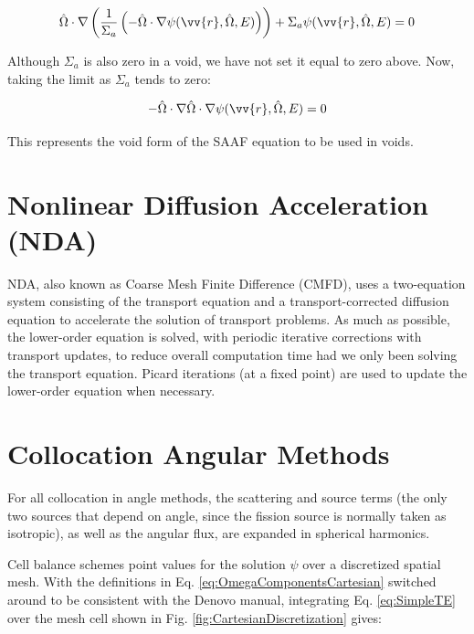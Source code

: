 \documentclass[10pt]{article}
\newcommand{\hO}{\hat{\Omega}}
\newcounter{subsubsubsection}[subsubsection]
\begin{document}
\begin{flushleft}
\begin{equation}
\label{eq:SAAFvoid1}
\hO   \cdot \nabla \left( \frac{1}{\Sigma_a}\left(-\hO  \cdot\nabla\psi(\vv{r}, \hO  , E)\right)\right) + \Sigma_a\psi(\vv{r}, \hO  , E) = 0
\end{equation}

Although \(\Sigma_a\) is also zero in a void, we have not set it equal to zero above. Now, taking the limit as \(\Sigma_a\) tends to zero:

\begin{equation}
\label{eq:SAAFvoid2}
-\hO   \cdot \nabla\hO  \cdot\nabla\psi(\vv{r}, \hO  , E) = 0
\end{equation}

This represents the void form of the SAAF equation to be used in voids.



\clearpage
\section{Nonlinear Diffusion Acceleration (NDA)}


NDA, also known as Coarse Mesh Finite Difference (CMFD), uses a two-equation system consisting of the transport equation and a transport-corrected diffusion equation to accelerate the solution of transport problems. As much as possible, the lower-order equation is solved, with periodic iterative corrections with transport updates, to reduce overall computation time had we only been solving the transport equation. Picard iterations (at a fixed point) are used to update the lower-order equation when necessary. 


\clearpage
\section{Collocation Angular Methods}

For all collocation in angle methods, the scattering and source terms (the only two sources that depend on angle, since the fission source is normally taken as isotropic), as well as the angular flux, are expanded in spherical harmonics. 

\clearpage



Cell balance schemes point values for the solution \(\psi\) over a discretized spatial mesh. With the definitions in Eq. \eqref{eq:OmegaComponentsCartesian} switched around to be consistent with the Denovo manual, integrating Eq. \eqref{eq:SimpleTE} over the mesh cell shown in Fig. \ref{fig:CartesianDiscretization} gives:


\end{flushleft}
\end{document}
